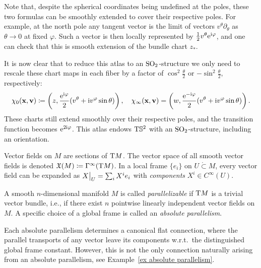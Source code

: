 \begin{example}
    Note that, despite the spherical coordinates being undefined at the poles, these two formulas can be smoothly extended to cover their respective poles. For example, at the north pole any tangent vector is the limit of vectors $v^\theta\partial_\theta$ as $\theta\to 0$ at fixed $\varphi$. Such a vector is then locally represented by $\frac12 v^\theta \mathrm{e}^{\mathrm{i}\varphi}$, and one can check that this is smooth extension of the bundle chart $z_\ast$.

    It is now clear that to reduce this atlas to an $\operatorname{SO}_2$-structure we only need to rescale these chart maps in each fiber by a factor of $\cos^2\frac{\theta}{2}$ or $-\sin^2\frac{\theta}{2}$, respectively:
    \[\chi_0(\mathbf{x},\mathbf{v})\coloneqq \left(z,\frac{\mathrm{e}^{\mathrm{i}\varphi}}{2}(v^\theta+\mathrm{i} v^\varphi\sin\theta) \right),\quad \chi_\infty(\mathbf{x},\mathbf{v})=\left(w,\frac{\mathrm{e}^{-\mathrm{i}\varphi}}{2}(v^\theta+\mathrm{i} v^\varphi\sin\theta )\right).\] 
    These charts still extend smoothly over their respective poles, and the transition function becomes $\mathrm{e}^{2\mathrm{i}\varphi}$. This atlas endows $\mathrm{T}\mathbb{S}^2$ with an $\operatorname{SO}_2$-structure, including an orientation.
\end{example}


\begin{defn}
    Vector fields on $M$ are sections of $\mathrm{T} M$. The vector space of all smooth vector fields is denoted $\mathfrak{X}(M)\coloneqq \Gamma^\infty(\mathrm{T} M)$. In a local frame $\{e_i\}$ on $U\mathring{\subset}M$, every vector field can be expanded as $\restr{X}{U}=\sum_i X^i e_i$ with \emph{components} $X^i\in C^\infty(U)$.
\end{defn}

\begin{defn}[Parallelism]\label{def parallelizable}
    A smooth $n$-dimensional manifold $M$ is called \emph{parallelizable} if $\mathrm{T} M$ is a trivial vector bundle, i.e., if there exist $n$ pointwise linearly independent vector fields on $M$. A specific choice of a global frame is called an \emph{absolute parallelism}.
\end{defn}

\begin{rem}
     Each absolute parallelism determines a canonical flat connection, where the parallel transports of any vector leave its components w.r.t.\ the distinguished global frame constant. However, this is not the only connection naturally arising from an absolute parallelism, see Example~\ref{ex absolute parallelism}.
\end{rem}


